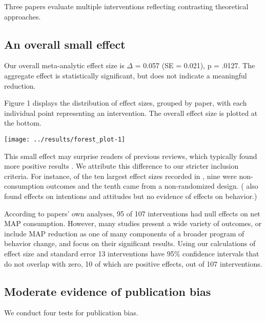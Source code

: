 \documentclass[sn-nature,pdflatex]{sn-jnl}
\begin{document}
Three papers \citep{piester2020, hennessy2016, kanchanachitra2020}
evaluate multiple interventions reflecting contrasting theoretical
approaches.

\subsection{An overall small effect}\label{sec2.2}

Our overall meta-analytic effect size is \(\Delta\) = 0.057 (SE =
0.021), p = .0127. The aggregate effect is statistically significant,
but does not indicate a meaningful reduction.

Figure 1 displays the distribution of effect sizes, grouped by paper,
with each individual point representing an intervention. The overall
effect size is plotted at the bottom.

\texttt{[image: ../results/forest\_plot-1]}

This small effect may surprise readers of previous reviews, which
typically found more positive results
\citep{mathur2021meta, meier2022, chang2023}. We attribute this
difference to our stricter inclusion criteria. For instance, of the ten
largest effect sizes recorded in \citep{mathur2021effectiveness}, nine
were non-consumption outcomes and the tenth came from a non-randomized
design. (\citep{bianchi2018conscious} also found effects on intentions
and attitudes but no evidence of effects on behavior.)

According to papers' own analyses, 95 of 107 interventions had null
effects on net MAP consumption. However, many studies present a wide
variety of outcomes, or include MAP reduction as one of many components
of a broader program of behavior change, and focus on their significant
results. Using our calculations of effect size and standard error 13
interventions have 95\% confidence intervals that do not overlap with
zero, 10 of which are positive effects, out of 107 interventions.

\subsection{Moderate evidence of publication bias}\label{sec2.3}

We conduct four tests for publication bias.

\begin{comment} 
introductory remarks about how this puts our main results in one light or another? 
\end{comment}
\end{document}
